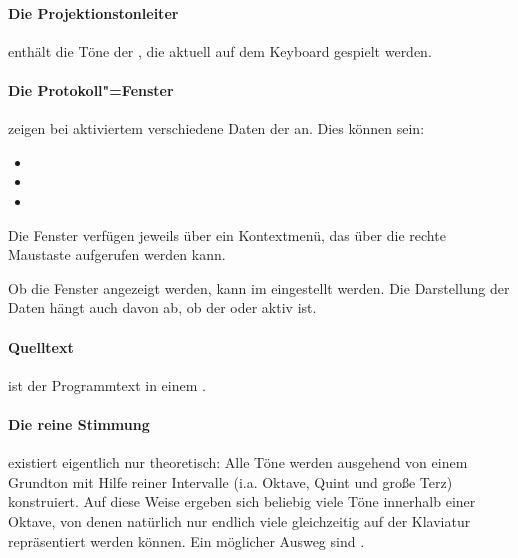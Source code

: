{\paragraph{Die Projektionstonleiter}\label{sec:DV_PROJTONLEITER}
  enthält die Töne der
  , die aktuell auf dem
  Keyboard gespielt werden.

\paragraph{Die Protokoll"=Fenster}\label{sec:DV_PROTOKOLL} 
  zeigen bei aktiviertem 
  verschiedene Daten der  an. Dies können
  sein:
  \begin{itemize}
  \item {}
  \item {}
  \item {}
  \end{itemize}
  Die Fenster verfügen jeweils über ein Kontextmenü, das über die
  rechte Maustaste aufgerufen werden kann.

  Ob die Fenster angezeigt werden, kann im
   eingestellt werden. Die
  Darstellung der Daten hängt auch davon ab, ob der
   oder
   aktiv
  ist.

\paragraph{Quelltext}\label{sec:DV_QUELLTEXT} ist der
  Programmtext in einem .

\paragraph{Die reine Stimmung}\label{sec:MT_JUST} existiert eigentlich nur
  theoretisch: Alle Töne werden ausgehend von einem Grundton mit Hilfe
  reiner Intervalle (i.a.  Oktave, Quint und große Terz) konstruiert.
  Auf diese Weise ergeben sich beliebig viele Töne innerhalb einer
  Oktave, von denen natürlich nur endlich viele gleichzeitig auf der
  Klaviatur repräsentiert werden können. Ein möglicher Ausweg sind
  .

}
